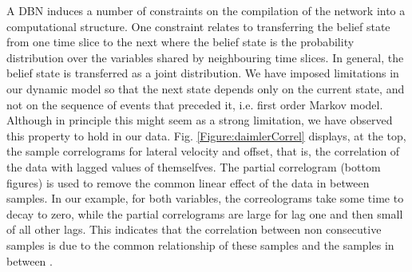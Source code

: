 A DBN induces a number of constraints on the compilation of the network into a computational structure. One constraint relates to transferring the belief state from one time slice to the next where the belief state is the probability distribution over the variables shared by neighbouring time slices. In general, the belief state is transferred as a joint distribution. We have imposed limitations in our dynamic model so that the next state depends only on the current state, and not on the sequence of events that preceded it, i.e. first order Markov model. Although in principle this might seem as a strong limitation, we have observed this property to hold in our data. Fig. \ref{Figure:daimlerCorrel} displays, at the top, the sample correlograms for lateral velocity and offset, that is, the correlation of the data with lagged values of themselfves. The partial correlogram (bottom figures) is used to remove the common linear effect of the data in between samples. In our example, for both variables, the correolograms take some time to decay to zero, while the partial correlograms are large for lag one and then small of all other lags. This indicates that the correlation between non consecutive samples is due to the common relationship of these samples and the samples in between \cite{Chapter 2: describing Univariate Time Series}.

